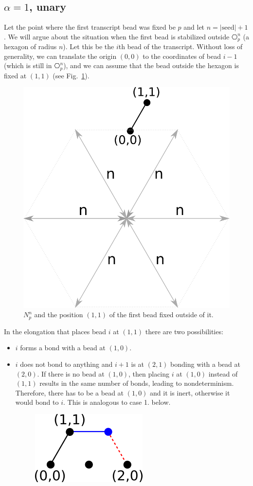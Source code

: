 \subsection{$\alpha = 1$, unary}

Let the point where the first transcript bead was fixed be $p$ and let $n=|\mathrm{seed}|+1$. We will argue about the situation when the first bead is stabilized outside $\hexagon_p^n$ (a hexagon of radius $n$). Let this be the $i$th bead of the transcript. Without loss of generality, we can translate the origin $(0,0)$ to the coordinates of bead $i-1$ (which is still in $\hexagon_p^n$), and we can assume that the bead outside the hexagon is fixed at $(1,1)$ (see Fig.~\ref{fig:hexagonOut}).
\begin{figure}
	\centering
	\includegraphics[width=0.3\linewidth]{./Fig/hexagonOut}
	\caption{$N_p^n$ and the position $(1,1)$ of the first bead fixed outside of it.}
	\label{fig:hexagonOut}
\end{figure}

In the elongation that places bead $i$ at $(1,1)$ there are two possibilities:
\begin{itemize}
	\item $i$ forms a bond with a bead at $(1,0)$.
	\item  $i$ does not bond to anything and $i+1$ is at $(2,1)$ bonding with a bead at $(2,0)$. If there is no bead at $(1,0)$, then placing $i$ at $(1,0)$ instead of $(1,1)$ results in the same number of bonds, leading to nondeterminism. Therefore, there has to be a bead at $(1,0)$ and it is inert, otherwise it would bond to $i$. This is analogous to case 1. below.%
	\begin{figure}
		\centering
		\includegraphics[width=0.2\linewidth]{./Fig/hexagonOut1}
		\label{fig:hexagonOut1}
	\end{figure}
	
\end{itemize}
 
